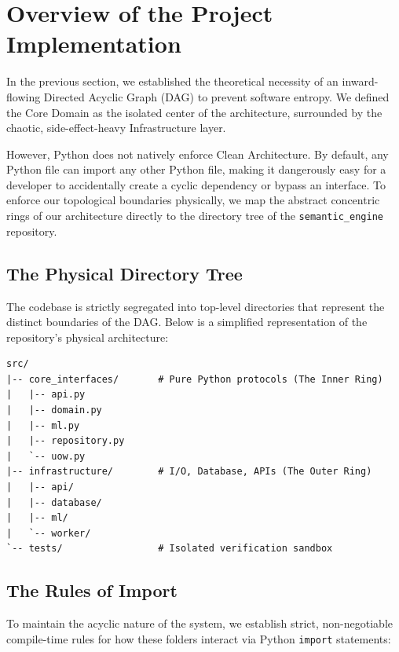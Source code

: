 \section{Overview of the Project Implementation}

In the previous section, we established the theoretical necessity of an inward-flowing Directed Acyclic Graph (DAG) to prevent software entropy. We defined the Core Domain as the isolated center of the architecture, surrounded by the chaotic, side-effect-heavy Infrastructure layer.

However, Python does not natively enforce Clean Architecture. By default, any Python file can import any other Python file, making it dangerously easy for a developer to accidentally create a cyclic dependency or bypass an interface. To enforce our topological boundaries physically, we map the abstract concentric rings of our architecture directly to the directory tree of the \texttt{semantic\_engine} repository.

\subsection*{The Physical Directory Tree}

The codebase is strictly segregated into top-level directories that represent the distinct boundaries of the DAG. Below is a simplified representation of the repository's physical architecture:

\begin{verbatim}
src/
|-- core_interfaces/       # Pure Python protocols (The Inner Ring)
|   |-- api.py
|   |-- domain.py
|   |-- ml.py
|   |-- repository.py
|   `-- uow.py
|-- infrastructure/        # I/O, Database, APIs (The Outer Ring)
|   |-- api/
|   |-- database/
|   |-- ml/
|   `-- worker/
`-- tests/                 # Isolated verification sandbox
\end{verbatim}

\subsection*{The Rules of Import}

To maintain the acyclic nature of the system, we establish strict, non-negotiable compile-time rules for how these folders interact via Python \texttt{import} statements:

